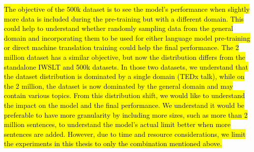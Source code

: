 \hl{The objective of the 500k dataset is to see the model's performance when slightly more data is included during the pre-training but with a different domain. This could help to understand whether randomly sampling data from the general domain and incorporating them to be used for either language model pre-training or direct machine translation training could help the final performance. The 2 million dataset has a similar objective, but now the distribution differs from the standalone IWSLT and 500k datasets. In those two datasets, we understand that the dataset distribution is dominated by a single domain (TEDx talk), while on the 2 million, the dataset is now dominated by the general domain and may contain various topics. From this distribution shift, we would like to understand the impact on the model and the final performance.
We understand it would be preferable to have more granularity by including more sizes, such as more than 2 million sentences, to understand the model's actual limit better when more sentences are added. However, due to time and resource considerations, we limit the experiments in this thesis to only the combination mentioned above.}

